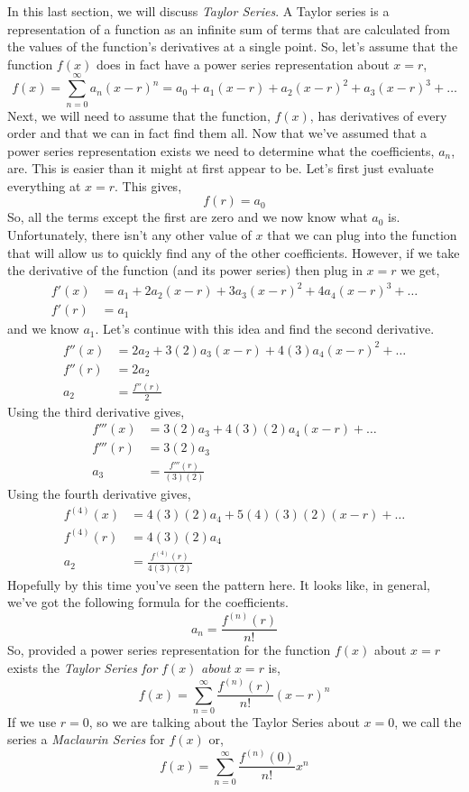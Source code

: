 \documentclass[10pt,reqno]{book}
\theoremstyle{definition}
\begin{document}
	In this last section, we will discuss \textit{Taylor Series}. A Taylor series is a representation of a function as an infinite sum of terms that are calculated from the values of the function's derivatives at a single point. So, let's assume that the function $ f(x) $ does in fact have a power series representation about $ x = r $,
	\[ f(x) = \sum\limits_{n=0}^{\infty} a_n (x-r)^n = a_0 + a_1(x-r) + a_2(x-r)^2 + a_3(x-r)^3 + \ldots \]
	Next, we will need to assume that the function, $ f(x) $, has derivatives of every order and that we can in fact find them all. Now that we've assumed that a power series representation exists we need to determine what the coefficients, $ a_n $, are. This is easier than it might at first appear to be. Let's first just evaluate everything at $ x=r $. This gives,
	\[ f(r) = a_0 \]
	So, all the terms except the first are zero and we now know what $ a_0 $ is. Unfortunately, there isn't any other value of $ x $ that we can plug into the function that will allow us to quickly find any of the other coefficients. However, if we take the derivative of the function (and its power series) then plug in $ x=r $ we get,
	\begin{align*}
		f'(x) &= a_1 + 2a_2(x-r) + 3a_3(x-r)^2 + 4a_4(x-r)^3 + \ldots\\
		f'(r) &= a_1
	\end{align*}
	and we know $ a_1 $. Let's continue with this idea and find the second derivative.
	\begin{align*}
	f''(x) &= 2a_2 + 3(2)a_3(x-r) + 4(3)a_4(x-r)^2 + \ldots\\
	f''(r) &= 2a_2\\
	a_2 &= \frac{f''(r)}{2}
	\end{align*}
	Using the third derivative gives,
	\begin{align*}
	f'''(x) &= 3(2)a_3 + 4(3)(2)a_4 (x-r) + \ldots\\
	f'''(r) &= 3(2)a_3\\
	a_3 &= \frac{f'''(r)}{(3)(2)}
	\end{align*}
	Using the fourth derivative gives,
	\begin{align*}
	f^{(4)}(x) &= 4(3)(2)a_4 + 5(4)(3)(2)(x-r) + \ldots\\
	f^{(4)}(r) &= 4(3)(2)a_4\\
	a_2 &= \frac{f^{(4)}(r)}{4(3)(2)}
	\end{align*}
	Hopefully by this time you've seen the pattern here. It looks like, in general, we've got the following formula for the coefficients.
	\[ a_n = \frac{f^{(n)}(r)}{n!} \]
	So, provided a power series representation for the function $ f(x) $ about $ x=r $ exists the\textit{ Taylor Series for} $ f(x) $ \textit{about} $ x=r $ is,
	\[ f(x) = \sum\limits_{n=0}^{\infty} \frac{f^{(n)}(r)}{n!} (x-r)^n \]
	If we use $ r=0 $, so we are talking about the Taylor Series about $ x=0 $, we call the series a \textit{Maclaurin Series} for $ f(x) $ or,
	\[ f(x) = \sum\limits_{n=0}^{\infty} \frac{f^{(n)}(0)}{n!} x^n \]
	
\end{document}
